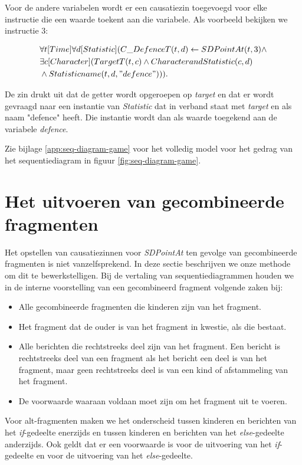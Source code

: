 Voor de andere variabelen wordt er een causatiezin toegevoegd voor elke instructie die een waarde toekent aan die variabele. Als voorbeeld bekijken we instructie 3:

\begin{align*}
	&\forall{t}[Time]\forall{d}[Statistic](C\_DefenceT(t, d) \leftarrow SDPointAt(t, 3) \land \\ &\exists{c}[Character](TargetT(t, c) \land CharacterandStatistic(c, d) \\ &\land Statisticname(t, d, "defence"))).
\end{align*}


De zin drukt uit dat de getter wordt opgeroepen op \textit{target} en dat er wordt gevraagd naar een instantie van \textit{Statistic} dat in verband staat met \textit{target} en als naam "defence" heeft. Die instantie wordt dan als waarde toegekend aan de variabele \textit{defence}.

Zie bijlage \ref{app:seq-diagram-game} voor het volledig model voor het gedrag van het sequentiediagram in figuur \ref{fig:seq-diagram-game}.


\section{Het uitvoeren van gecombineerde fragmenten}\label{sec:combined-fragment}
Het opstellen van causatiezinnen voor \textit{SDPointAt} ten gevolge van gecombineerde fragmenten is niet vanzelfsprekend. In deze sectie beschrijven we onze methode om dit te bewerkstelligen.
Bij de vertaling van sequentiediagrammen houden we in de interne voorstelling van een gecombineerd fragment volgende zaken bij:

\begin{itemize}
	\item Alle gecombineerde fragmenten die kinderen zijn van het fragment.
	\item Het fragment dat de ouder is van het fragment in kwestie, als die bestaat.
	\item Alle berichten die rechtstreeks deel zijn van het fragment. Een bericht is rechtstreeks deel van een fragment als het bericht een deel is van het fragment, maar geen rechtstreeks deel is van een kind of afstammeling van het fragment.
	\item De voorwaarde waaraan voldaan moet zijn om het fragment uit te voeren. 
\end{itemize}

Voor alt-fragmenten maken we het onderscheid tussen kinderen en berichten van het \textit{if}-gedeelte enerzijds en tussen kinderen en berichten van het \textit{else}-gedeelte anderzijds. Ook geldt dat er een voorwaarde is voor de uitvoering van het \textit{if}-gedeelte en voor de uitvoering van het \textit{else}-gedeelte.

